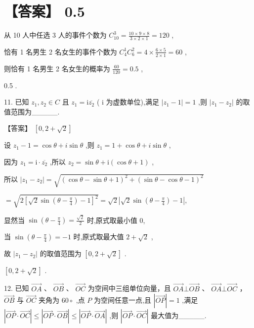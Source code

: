 \documentclass[10pt]{article}
\begin{document}
\section*{【答案】 0.5}

从 10 人中任选 3 人的事件个数为 \({C}_{10}^{3} = \frac{{10} \times  9 \times  8}{3 \times  2 \times  1} = {120}\) ,

恰有 1 名男生 2 名女生的事件个数为 \({C}_{4}^{1}{C}_{6}^{2} = 4 \times  \frac{6 \times  5}{2 \times  1} = {60}\) ,

则恰有 1 名男生 2 名女生的概率为 \(\frac{60}{120} = {0.5}\) ,

0.5 .

11. 已知 \({z}_{1},{z}_{2} \in  C\) 且 \({z}_{1} = \mathrm{i}\overline{{z}_{2}}\) ( \(\mathrm{i}\) 为虚数单位),满足 \(\left| {{z}_{1} - 1}\right|  = 1\) ,则 \(\left| {{z}_{1} - {z}_{2}}\right|\) 的取值范围为\_\_\_\_\_.

【答案】 \(\left\lbrack  {0,2 + \sqrt{2}}\right\rbrack\)

设 \({z}_{1} - 1 = \cos \theta  + i\sin \theta\) ,则 \({z}_{1} = 1 + \cos \theta  + i\sin \theta\) ,

因为 \({z}_{1} = \mathrm{i} \cdot  \overline{{z}_{2}}\) ,所以 \({z}_{2} = \sin \theta  + \mathrm{i}\left( {\cos \theta  + 1}\right)\) ,

所以 \(\left| {{z}_{1} - {z}_{2}}\right|  = \sqrt{{\left( \cos \theta  - \sin \theta  + 1\right) }^{2} + {\left( \sin \theta  - \cos \theta  - 1\right) }^{2}}\)

\(= \sqrt{2{\left\lbrack  \sqrt{2}\sin \left( \theta  - \frac{\pi }{4}\right)  - 1\right\rbrack  }^{2}} = \sqrt{2}\left| {\sqrt{2}\sin \left( {\theta  - \frac{\pi }{4}}\right)  - 1}\right| ,\)

显然当 \(\sin \left( {\theta  - \frac{\pi }{4}}\right)  = \frac{\sqrt{2}}{2}\) 时,原式取最小值 0,

当 \(\sin \left( {\theta  - \frac{\pi }{4}}\right)  =  - 1\) 时,原式取最大值 \(2 + \sqrt{2}\) ,

故 \(\left| {{z}_{1} - {z}_{2}}\right|\) 的取值范围为 \(\left\lbrack  {0,2 + \sqrt{2}}\right\rbrack\) .

\(\left\lbrack  {0,2 + \sqrt{2}}\right\rbrack\) .

12. 已知 \(\overrightarrow{OA}\) 、 \(\overrightarrow{OB}\) 、 \(\overrightarrow{OC}\) 为空间中三组单位向量，且 \(\overrightarrow{OA}\bot \overrightarrow{OB}\) 、 \(\overrightarrow{OA}\bot \overrightarrow{OC}\) ， \(\overrightarrow{OB}\) 与 \(\overrightarrow{OC}\) 夹角为 \({60} \circ\) ,点 \(P\) 为空间任意一点,且 \(\left| \overrightarrow{OP}\right|  = 1\) ,满足 \(\left| {\overrightarrow{OP} \cdot  \overrightarrow{OC}}\right|  \leq  \left| {\overrightarrow{OP} \cdot  \overrightarrow{OB}}\right|  \leq  \left| {\overrightarrow{OP} \cdot  \overrightarrow{OA}}\right|\) ,则 \(\left| {\overrightarrow{OP} \cdot  \overrightarrow{OC}}\right|\) 最大值为\_\_\_\_\_.
\end{document}
